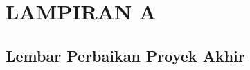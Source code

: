 \appendix
\chapter*{LAMPIRAN A}
\setcounter{section}{0} %
\setcounter{page}{1}

\renewcommand{\thesection}{\Alph{section}}
\renewcommand{\thesubsection}{\Alph{section}.\arabic{subsection}\hspace{-0.25cm}}
\renewcommand{\thepage}{L - \arabic{page}}

\section{Lembar Perbaikan Proyek Akhir}

